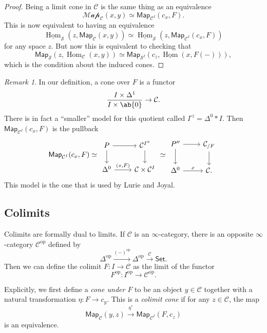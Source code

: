 \documentclass[10pt, oneside]{memoir}
\theoremstyle{definition}
\theoremstyle{remark}
\newtheorem{rmk}[thm]{Remark}
\theoremstyle{plain}
\theoremstyle{definition}
\theoremstyle{remark}
\newcommand{\mc}[1]{\mathcal{#1}}
\newcommand{\ms}[1]{\mathsf{#1}}
\newcommand{\ul}[1]{\underline{#1}}
\newcommand{\1}{\mathbf{1}}
\newcommand{\2}{\mathbf{2}}
\newcommand{\3}{\mathbf{3}}
\DeclareMathOperator{\Hom}{Hom}
\DeclareMathOperator{\op}{op}
\begin{document}
\begin{proof}
    Being a limit cone in $\mc{C}$ is the same thing as an equivalence
    \[ \mc{Map}_{\mc{C}}(x, y) \simeq \ms{Map}_{\mc{C}^I} (c_x, F). \]
    This is now equivalent to having an equivalence
    \[ \ul{\Hom}_{\mc{S}}(z, \ms{Map}_{\mc{C}}(x,y)) \simeq \ul{\Hom}_{\mc{S}}(z, \ms{Map}_{\mc{C}^I}(c_x, F)) \]
    for any space $z$. But now this is equivalent to checking that
    \[ \ms{Map}_{\mc{S}}(z, \Hom_{\mc{C}}(x,y)) \simeq \ms{Map}_{\mc{S}^I} (c_z, \ul{\Hom}(x, F(-))), \]
    which is the condition about the induced cones.
\end{proof}

\begin{rmk}
    In our definition, a cone over $F$ is a functor
    \[ \frac{I \times \Delta^1}{I \times \ab\{0\}} \to \mc{C}. \]
    There is in fact a ``smaller'' model for this quotient called $I^{\triangleleft} = \Delta^0 * I$.
    Then $\ms{Map}_{\mc{C}^I}(c_x, F)$ is the pullback
    \begin{equation*} \ms{Map}_{\mc{C}^I}(c_x, F) \simeq 
    \begin{tikzcd}
        P \ar{d} \ar{r} & \mc{C}^{I^{\triangleleft}} \ar{d} \\
        \Delta^0 \ar{r}{(x, F)} & \mc{C} \times \mc{C}^I 
    \end{tikzcd} \simeq
        \begin{tikzcd}
            P'' \ar{d} \ar{r} & \mc{C}_{/F} \ar{d} \\
            \Delta^0 \ar{r}{x} & \mc{C}.
        \end{tikzcd}
    \end{equation*}
    This model is the one that is used by Lurie and Joyal.
\end{rmk}


\subsection{Colimits}%
\label{sub:Colimits}

Colimits are formally dual to limits. If $\mc{C}$ is an $\infty$-category, there is an opposite $\infty$-category $\mc{C}^{\op}$ defined by
\[ \Delta^{\op} \xrightarrow{(-)^{\op}} \Delta^{\op} \xrightarrow{\mc{C}} \ms{Set}. \]
Then we can define the colimit $F \colon I \to \mc{C}$ as the limit of the functor
\[ F^{\op} \colon I^{\op} \to \mc{C}^{\op}. \]

Explicitly, we first define a \textit{cone under $F$} to be an object $y \in \mc{C}$ together with a natural transformation $\eta \colon F \to c_y$. This is a \textit{colimit cone} if for any $z \in \mc{C}$, the map
\[ \ms{Map}_{\mc{C}}(y, z) \xrightarrow{\eta^*} \ms{Map}_{\mc{C}^I} (F, c_z) \]
is an equivalence.
\end{document}

